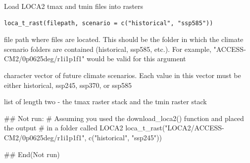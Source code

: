 %
\begin{Description}
Load LOCA2 tmax and tmin files into rasters
\end{Description}
%
\begin{Usage}
\begin{verbatim}
loca_t_rast(filepath, scenario = c("historical", "ssp585"))
\end{verbatim}
\end{Usage}
%
\begin{Arguments}
\begin{ldescription}
\item[\code{filepath}] file path where files are located. This should
be the folder in which the climate scenario folders are contained
(historical, ssp585, etc.). For example, "ACCESS-CM2/0p0625deg/r1i1p1f1"
would be valid for this argument

\item[\code{scenario}] character vector of future climate scenarios. Each value
in this vector must be either historical, ssp245, ssp370, or ssp585
\end{ldescription}
\end{Arguments}
%
\begin{Value}
list of length two - the tmax raster stack and the tmin raster
stack
\end{Value}
%
\begin{Examples}
\begin{ExampleCode}
## Not run: 
# Assuming you used the download_loca2() function and placed the output
# in a folder called LOCA2
loca_t_rast("LOCA2/ACCESS-CM2/0p0625deg/r1i1p1f1",
            c("historical", "ssp245"))

## End(Not run)
\end{ExampleCode}
\end{Examples}
